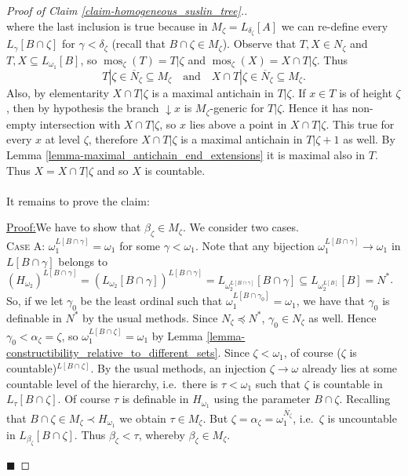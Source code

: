 \documentclass[11pt,a4paper]{report}
\theoremstyle{definition}
\theoremstyle{num.custom-title}
\theoremstyle{custom-title}
\newenvironment{claimproof}[1]{\par\noindent\underline{Proof:}\space#1}{\leavevmode\unskip\penalty9999 \hbox{}\nobreak\hfill\quad\hbox{$\blacksquare$}} %
\DeclareMathOperator{\sse}{\subseteq}
\DeclareMathOperator{\mos}{mos}
\newcommand{\ol}{\overline}
\begin{document}
\begin{proof}[Proof of Claim \ref{claim-homogeneous_suslin_tree}.]
\[\]
where the last inclusion is true because in $M_\zeta = L_{\delta_\zeta}[A]$ we can re-define every $L_\gamma[B \cap \zeta]$ for $\gamma < \delta_\zeta$ (recall that $B \cap \zeta \in M_\zeta$). Observe that $T,X \in N_\zeta$ and $T,X \sse L_{\omega_1}[B]$, so $\mos_\zeta(T) = T|\zeta$ and $\mos_\zeta(X) = X \cap T|\zeta$. Thus
\[
T|\zeta \in \ol{N}_\zeta \sse M_\zeta \quad \text{and} \quad X \cap T|\zeta \in \ol{N}_\zeta \sse M_\zeta.
\]
Also, by elementarity $X \cap T|\zeta$ is a maximal antichain in $T|\zeta$. If $x \in T$ is of height $\zeta$, then by hypothesis the branch ${\downarrow} x$ is $M_\zeta$-generic for $T|\zeta$. Hence it has non-empty intersection with $X \cap T|\zeta$, so $x$ lies above a point in $X \cap T|\zeta$. This true for every $x$ at level $\zeta$, therefore $X \cap T|\zeta$ is a maximal antichain in $T|\zeta+1$ as well. By Lemma \ref{lemma-maximal_antichain_end_extensions} it is maximal also in $T$. Thus $X = X \cap T|\zeta$ and so $X$ is countable.\\
\\
It remains to prove the claim:
\begin{claimproof}
We have to show that $\beta_\zeta \in M_\zeta$. We consider two cases.\\[6pt]
\textsc{Case A:} $\omega_1^{L[B \cap \gamma]} = \omega_1$ for some $\gamma < \omega_1$. Note that any bijection $\omega_1^{L[B \cap \gamma]} \to \omega_1$ in $L[B \cap \gamma]$ belongs to $(H_{\omega_2})^{L[B \cap \gamma]} = (L_{\omega_2}[B \cap \gamma])^{L[B \cap \gamma]} = L_{\omega_2^{L[B \cap \gamma]}}[B \cap \gamma] \sse L_{\omega_2^{L[B]}}[B] = N^*$.\\
So, if we let $\gamma_0$ be the least ordinal such that $\omega_1^{L[B \cap \gamma_0]} = \omega_1$, we have that $\gamma_0$ is definable in $N^*$ by the usual methods. Since $N_\zeta \preceq N^*$, $\gamma_0 \in N_\zeta$ as well. Hence $\gamma_0 < \alpha_\zeta = \zeta$, so $\omega_1^{L[B \cap \zeta]} = \omega_1$ by Lemma \ref{lemma-constructibility_relative_to_different_sets}. Since $\zeta < \omega_1$, of course ($\zeta$ is countable)$^{L[B \cap \zeta]}$. By the usual methods, an injection $\zeta \to \omega$ already lies at some countable level of the hierarchy, i.e.\ there is $\tau < \omega_1$ such that $\zeta$ is countable in $L_\tau [B \cap \zeta]$. Of course $\tau$ is definable in $H_{\omega_1}$ using the parameter $B \cap \zeta$.
Recalling that $B \cap \zeta \in M_\zeta \prec H_{\omega_1}$ we obtain $\tau \in M_\zeta$. But $\zeta = \alpha_\zeta = \omega_1^{\ol{N}_\zeta}$, i.e.\ $\zeta$ is uncountable in $L_{\beta_\zeta}[B \cap \zeta]$. Thus $\beta_\zeta < \tau$, whereby $\beta_\zeta \in M_\zeta$.

\end{claimproof}
\end{proof}
\end{document}

